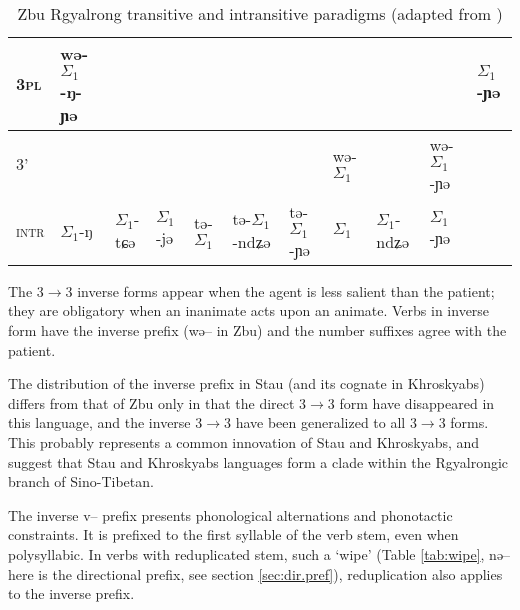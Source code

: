 \documentclass[oldfontcommands,twoside,12pt]{memoir}
\newcommand{\ipa}[1]{{\phon #1}} %
\newcommand{\grise}[1]{\cellcolor{lightgray}\textbf{#1}}
\newcommand{\ra}{$\Sigma_1$}
\begin{document}
\begin{landscape}
\begin{table}[h]
\begin{tabular}{lllllllllll}
\textsc{3pl} &  \cellcolor[wave]{500}	\ipa{wə-\ra{}-ŋ-ɲə} & 	\cellcolor[wave]{500} & \cellcolor[wave]{500} & 	\cellcolor[wave]{500} & 	\cellcolor[wave]{500} & 	\cellcolor[wave]{500} & \multicolumn{3}{c}{\grise{}} &	\ipa{\ra{}-ɲə} \\ 	
\midrule
\textsc{3'} & 	\multicolumn{6}{c}{\grise{}} &\cellcolor[wave]{500}	\ipa{wə-\ra{}} & 	\cellcolor[wave]{500}\ipa{wə-\ra{}-ndʑə} & \cellcolor[wave]{500}	\ipa{wə-\ra{}-ɲə} & 	\grise{} \\	
\midrule
\textsc{intr}&\ipa{\ra{}-ŋ}&\ipa{\ra{}-tɕə}&\ipa{\ra{}-jə}&\ipa{tə-\ra{}}&\ipa{tə-\ra{}-ndʑə}&\ipa{tə-\ra{}-ɲə}&\ipa{\ra{}}&\ipa{\ra{}-ndʑə} &\ipa{\ra{}-ɲə}& 	\grise{} \\	
	\bottomrule
\end{tabular}
\caption{Zbu Rgyalrong transitive and intransitive paradigms (adapted from \citealt{gongxun14agreement})} \label{tab:zbu.tr}
\end{table}
\end{landscape}


The 3$\rightarrow$3 inverse forms appear when the agent is less salient than the patient; they are obligatory when an inanimate acts upon an animate. Verbs in inverse form have the inverse prefix (\ipa{wə}-- in Zbu) and the number suffixes agree with the patient.

The distribution of the inverse prefix in Stau (and its cognate in Khroskyabs) differs from that of Zbu only in that the direct 3$\rightarrow$3 form have disappeared in this language, and the inverse 3$\rightarrow$3 have been generalized to all 3$\rightarrow$3 forms. This probably represents a common innovation of Stau and Khroskyabs, and suggest that Stau and Khroskyabs languages form a clade within the Rgyalrongic branch of Sino-Tibetan.


The inverse \ipa{v}-- prefix presents phonological alternations and phonotactic constraints. It is prefixed to the first syllable of the verb stem, even when polysyllabic. In verbs with reduplicated stem, such a `wipe' (Table \ref{tab:wipe}, \ipa{nə--} here is the directional prefix, see section \ref{sec:dir.pref}), reduplication also applies to the inverse prefix.
\end{document}
